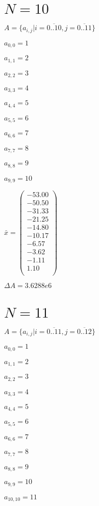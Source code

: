 \documentclass[a4paper,12pt]{article}
\begin{document}
\section{ $N = 10$ }
$A = \{ a _{ i, j } | i = \overline { 0..10 }, j = \overline { 0..11 } \}$

$a _{ 0, 0 } = 1$

$a _{ 1, 1 } = 2$

$a _{ 2, 2 } = 3$

$a _{ 3, 3 } = 4$

$a _{ 4, 4 } = 5$

$a _{ 5, 5 } = 6$

$a _{ 6, 6 } = 7$

$a _{ 7, 7 } = 8$

$a _{ 8, 8 } = 9$

$a _{ 9, 9 } = 10$

$\bar { x } = \begin{pmatrix}
-53.00 \\
-50.50 \\
-31.33 \\
-21.25 \\
-14.80 \\
-10.17 \\
-6.57 \\
-3.62 \\
-1.11 \\
1.10 \\
\end{pmatrix}
$

$\Delta A = 3.6288e6$



\section{ $N = 11$ }
$A = \{ a _{ i, j } | i = \overline { 0..11 }, j = \overline { 0..12 } \}$

$a _{ 0, 0 } = 1$

$a _{ 1, 1 } = 2$

$a _{ 2, 2 } = 3$

$a _{ 3, 3 } = 4$

$a _{ 4, 4 } = 5$

$a _{ 5, 5 } = 6$

$a _{ 6, 6 } = 7$

$a _{ 7, 7 } = 8$

$a _{ 8, 8 } = 9$

$a _{ 9, 9 } = 10$

$a _{ 10, 10 } = 11$
\end{document}
